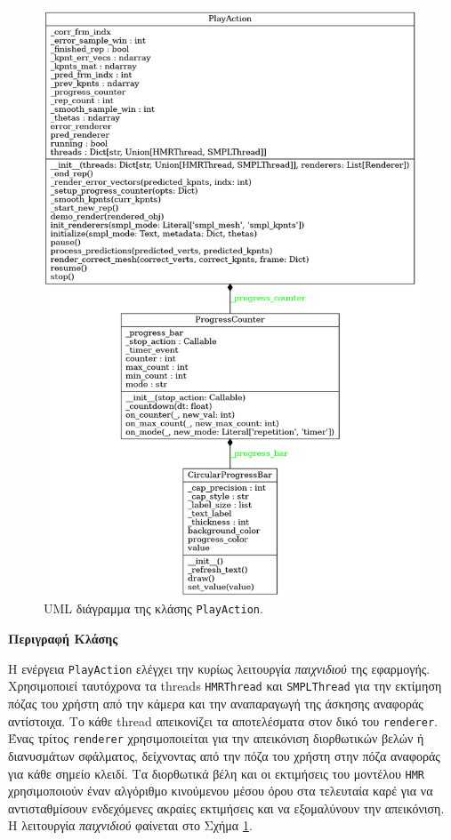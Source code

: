 \begin{figure}[H]
	\centering
	\includegraphics[scale=0.4]{images/chapter5/play_action_uml.png}
	\caption{UML διάγραμμα της κλάσης \texttt{PlayAction}.}
	\label{fig:play_action}
\end{figure}

\noindent\textbf{Περιγραφή Κλάσης}

Η ενέργεια \texttt{PlayAction} ελέγχει την κυρίως λειτουργία \textsl{παιχνιδιού} της εφαρμογής. Χρησιμοποιεί ταυτόχρονα τα threads \texttt{HMRThread} και \texttt{SMPLThread} για την εκτίμηση πόζας του χρήστη από την κάμερα και την αναπαραγωγή της άσκησης αναφοράς αντίστοιχα. Το κάθε thread απεικονίζει τα αποτελέσματα στον δικό του \texttt{renderer}. Ένας τρίτος \texttt{renderer} χρησιμοποιείται για την απεικόνιση διορθωτικών βελών ή διανυσμάτων σφάλματος, δείχνοντας από την πόζα του χρήστη στην πόζα αναφοράς για κάθε σημείο κλειδί. Τα διορθωτικά βέλη και οι εκτιμήσεις του μοντέλου \texttt{HMR} χρησιμοποιούν έναν αλγόριθμο κινούμενου μέσου όρου στα τελευταία καρέ για να αντισταθμίσουν ενδεχόμενες ακραίες εκτιμήσεις και να εξομαλύνουν την απεικόνιση. Η λειτουργία \textsl{παιχνιδιού} φαίνεται στο Σχήμα \ref{fig:play_action}.

